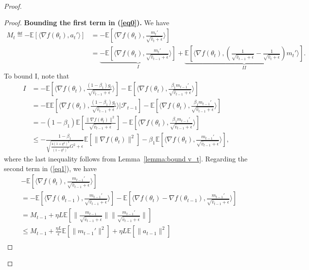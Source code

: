 \documentclass[11pt]{article}
\begin{document}
\begin{proof}
\begin{proof}
\textbf{Bounding the first term in (\ref{eq0}).} We have
\begin{align*}
    M_t\eqdef -\mathbb E[\langle \nabla f(\theta_t), a_t'\rangle]&=-\mathbb E[\langle \nabla f(\theta_t), \frac{m_t'}{\sqrt{\hat v_t+\epsilon}}\rangle]\\
    &=\underbrace{-\mathbb E[\langle \nabla f(\theta_t), \frac{m_t'}{\sqrt{\hat v_{t-1}+\epsilon}} \rangle]}_{I}+\underbrace{\mathbb E[\langle \nabla f(\theta_t), (\frac{1}{\sqrt{\hat v_{t-1}+\epsilon}}-\frac{1}{\sqrt{\hat v_t+\epsilon}})m_t' \rangle]}_{II}.
\end{align*}
To bound I, note that
\begin{align}
    I&=-\mathbb E[\langle \nabla f(\theta_t), \frac{(1-\beta_1)g_t}{\sqrt{\hat v_{t-1}+\epsilon}} \rangle] -\mathbb E[\langle \nabla f(\theta_t), \frac{\beta_1 m_{t-1}'}{\sqrt{\hat v_{t-1}+\epsilon}} \rangle] \nonumber\\
    &=-\mathbb E\mathbb E[\langle \nabla f(\theta_t), \frac{(1-\beta_1)g_t}{\sqrt{\hat v_{t-1}+\epsilon}} \rangle|\mathcal F_{t-1}] -\mathbb E[\langle \nabla f(\theta_t), \frac{\beta_1 m_{t-1}'}{\sqrt{\hat v_{t-1}+\epsilon}} \rangle] \nonumber\\
    &=-(1-\beta_1)\mathbb E[\frac{\|\nabla f(\theta_t)\|^2}{\sqrt{\hat v_{t-1}+\epsilon}}] - \mathbb E[\langle \nabla f(\theta_t), \frac{\beta_1 m_{t-1}'}{\sqrt{\hat v_{t-1}+\epsilon}} \rangle] \nonumber\\
    &\leq -\frac{1-\beta_1}{\sqrt{\frac{4(1+q^2)^3}{(1-q^2)^2}G^2+\epsilon}}\mathbb E[\|\nabla f(\theta_t)\|^2]- \beta_1\mathbb E[\langle \nabla f(\theta_t), \frac{ m_{t-1}'}{\sqrt{\hat v_{t-1}+\epsilon}} \rangle],  \label{eq1}
\end{align}
where the last inequality follows from Lemma~\ref{lemma:bound v_t}. Regarding the second term in (\ref{eq1}), we have
\begin{align}
    &- \mathbb E[\langle \nabla f(\theta_t), \frac{ m_{t-1}'}{\sqrt{\hat v_{t-1}+\epsilon}} \rangle] \nonumber\\
    &=-\mathbb E[\langle\nabla f(\theta_{t-1}), \frac{ m_{t-1}'}{\sqrt{\hat v_{t-1}+\epsilon}} \rangle]- \mathbb E[\langle \nabla f(\theta_t)-\nabla f(\theta_{t-1}), \frac{ m_{t-1}'}{\sqrt{\hat v_{t-1}+\epsilon}} \rangle] \nonumber\\
    &=M_{t-1}+ \eta L\mathbb E[\|\frac{m_{t-1}}{\sqrt{\hat v_{t-1}+\epsilon}}\| \|\frac{m_{t-1}'}{\sqrt{\hat v_{t-1}+\epsilon}}\|] \nonumber\\
    &\leq M_{t-1}+\frac{\eta L}{\epsilon}\mathbb E[\|m_{t-1}'\|^2]+\eta L\mathbb E[\|a_{t-1}\|^2] \\

\end{align}
\end{proof}
\end{proof}
\end{document}
